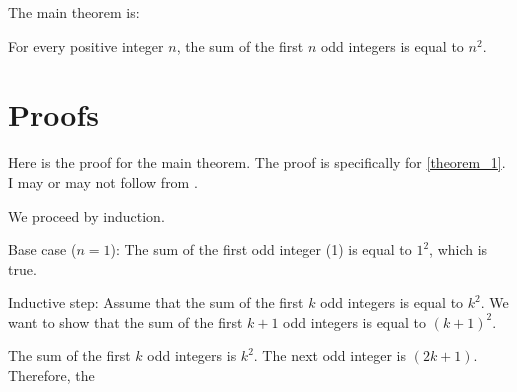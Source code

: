 \documentclass{article}
\begin{document}
The main theorem is:

\begin{theorem}
\label{theorem_1}
For every positive integer $n$, the sum of the first $n$ odd integers is equal to $n^2$.

\end{theorem}

\section{Proofs}
\label{proofs}
Here is the proof for the main theorem. The proof is specifically for \autoref{theorem_1}. I may or may not follow from \cite{rudelsonSparseReconstructionFourier2008}.

We proceed by induction.

Base case ($n = 1$): The sum of the first odd integer (1) is equal to $1^2$, which is true.

Inductive step: Assume that the sum of the first $k$ odd integers is equal to $k^2$. We want to show that the sum of the first $k+1$ odd integers is equal to $(k+1)^2$.

The sum of the first $k$ odd integers is $k^2$. The next odd integer is $(2k+1)$. Therefore, the

\printbibliography
\end{document}
